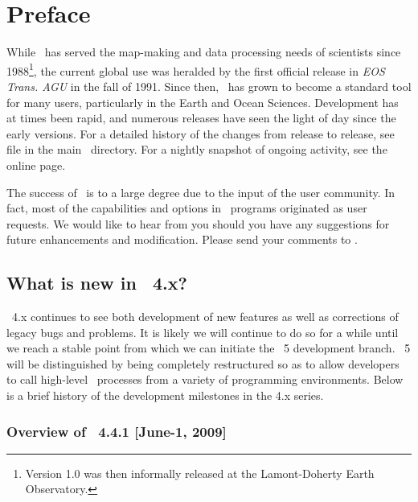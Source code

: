 %
%
\chapter{Preface} 
\label{ch:1}
\thispagestyle{headings}

While \GMT\ has served the map-making and data processing needs of scientists since 1988\footnote{Version
1.0 was then informally released at the Lamont-Doherty Earth Observatory.}, the current global use was
heralded by the first official release in \emph{EOS Trans. AGU} in the fall of 1991.  Since then,
\GMT\ has grown to become a standard tool for many users, particularly in the Earth and Ocean Sciences.
Development has at times been rapid, and numerous releases have seen the light of day since the early
versions.  For a detailed history of the changes from release to release, see file 
in the main \GMT\ directory.  For a nightly snapshot of ongoing activity, see the online
 page.

The success of \GMT\ is to a large degree due to the input of the user community. In fact, most of the
capabilities and options in \GMT\ programs originated as user requests.
We would like to hear from you should you have any suggestions for future enhancements and modification.
Please send your comments to
.

\section{What is new in \gmt\ 4.x?}

\GMT\ 4.x continues to see both development of new features as well as corrections of
legacy bugs and problems.  It is likely we will continue to do so for a while until we
reach a stable point from which we can initiate the \GMT\ 5 development branch.  \GMT\ 5
will be distinguished by being completely restructured so as to allow developers to call
high-level \GMT\ processes from a variety of programming environments.  Below is a brief
history of the development milestones in the 4.x series.

\subsection{Overview of \gmt\ 4.4.1 [June-1, 2009]}

